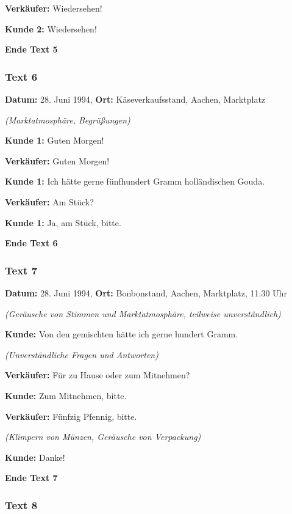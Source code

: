 \documentclass[
]{article}
\begin{document}
\textbf{Verkäufer:} Wiedersehen!

\textbf{Kunde 2:} Wiedersehen!

\textbf{Ende Text 5}

\subsubsection{\texorpdfstring{\textbf{Text 6}}{Text 6}}\label{text-6}

\textbf{Datum:} 28. Juni 1994, \textbf{Ort:} Käseverkaufsstand, Aachen,
Marktplatz

\emph{(Marktatmosphäre, Begrüßungen)}

\textbf{Kunde 1:} Guten Morgen!

\textbf{Verkäufer:} Guten Morgen!

\textbf{Kunde 1:} Ich hätte gerne fünfhundert Gramm holländischen Gouda.

\textbf{Verkäufer:} Am Stück?

\textbf{Kunde 1:} Ja, am Stück, bitte.

\textbf{Ende Text 6}

\subsubsection{\texorpdfstring{\textbf{Text 7}}{Text 7}}\label{text-7}

\textbf{Datum:} 28. Juni 1994, \textbf{Ort:} Bonbonstand, Aachen,
Marktplatz, 11:30 Uhr

\emph{(Geräusche von Stimmen und Marktatmosphäre, teilweise
unverständlich)}

\textbf{Kunde:} Von den gemischten hätte ich gerne hundert Gramm.

\emph{(Unverständliche Fragen und Antworten)}

\textbf{Verkäufer:} Für zu Hause oder zum Mitnehmen?

\textbf{Kunde:} Zum Mitnehmen, bitte.

\textbf{Verkäufer:} Fünfzig Pfennig, bitte.

\emph{(Klimpern von Münzen, Geräusche von Verpackung)}

\textbf{Kunde:} Danke!

\textbf{Ende Text 7}

\subsubsection{\texorpdfstring{\textbf{Text 8}}{Text 8}}\label{text-8}
\end{document}
